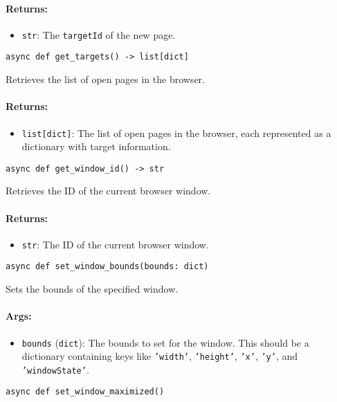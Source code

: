 \documentclass{article}
\begin{document}
\paragraph{Returns:}
\begin{itemize}
    \item \texttt{str}: The \texttt{targetId} of the new page.
\end{itemize}

\noindent\texttt{async def get\_targets() -> list[dict]}

\noindent Retrieves the list of open pages in the browser.

\paragraph{Returns:}
\begin{itemize}
    \item \texttt{list[dict]}: The list of open pages in the browser, each represented as a dictionary with target information.
\end{itemize}

\noindent\texttt{async def get\_window\_id() -> str}

\noindent Retrieves the ID of the current browser window.

\paragraph{Returns:}
\begin{itemize}
    \item \texttt{str}: The ID of the current browser window.
\end{itemize}

\noindent\texttt{async def set\_window\_bounds(bounds: dict)}

\noindent Sets the bounds of the specified window.

\paragraph{Args:}
\begin{itemize}
    \item \texttt{bounds} (\texttt{dict}): The bounds to set for the window. This should be a dictionary containing keys like \texttt{'width'}, \texttt{'height'}, \texttt{'x'}, \texttt{'y'}, and \texttt{'windowState'}.
\end{itemize}

\noindent\texttt{async def set\_window\_maximized()}
\end{document}
